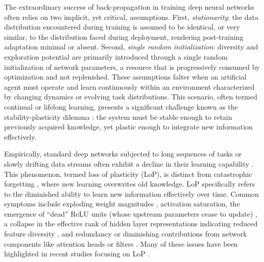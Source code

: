 \documentclass{article}
\begin{document}
The extraordinary success of back-propagation in training deep neural networks often relies on two implicit, yet critical, assumptions. First, \emph{stationarity}: the data distribution encountered during training is assumed to be identical, or very similar, to the distribution faced during deployment, rendering post-training adaptation minimal or absent. Second, \emph{single random initialization}: diversity and exploration potential are primarily introduced through a single random initialization of network parameters, a resource that is progressively consumed by optimization and not replenished. These assumptions falter when an artificial agent must operate and learn continuously within an environment characterized by changing dynamics or evolving task distributions. This scenario, often termed continual or lifelong learning, presents a significant challenge known as the stability-plasticity dilemma \citep{abraham2005memory, chaudhry2018riemannian}: the system must be stable enough to retain previously acquired knowledge, yet plastic enough to integrate new information effectively.




Empirically, standard deep networks subjected to long sequences of tasks or slowly drifting data streams often exhibit a decline in their learning capability \citep{dohare2024loss, berariu2021plasticity, dohare2021continual, nikishin2022primacy, lyle2023understanding}. This phenomenon, termed loss of plasticity (LoP), is distinct from catastrophic forgetting \citep{mccloskey1989catastrophic, ratcliff1990connectionist, french1999catastrophic}, where new learning overwrites old knowledge. LoP specifically refers to the diminished ability to learn new information effectively over time. Common symptoms include exploding weight magnitudes \citep{nikishin2022primacy}, activation saturation, the emergence of ``dead'' ReLU units (whose upstream parameters cease to update) \citep{nair2010rectified, sokar2023dormant, dohare2021continual, lyle2022understanding}, a collapse in the effective rank of hidden layer representations indicating reduced feature diversity \citep{papyan2020prevalence, huh2022lowrank, kumar2020implicit, gulcehre2022empirical}, and redundancy or diminishing contributions from network components like attention heads or filters \citep{lyle2023understanding}. Many of these issues have been highlighted in recent studies focusing on LoP \citep{dohare2023maintaining, kumar2024regenerative, ash2020warmstarting}.
\end{document}
